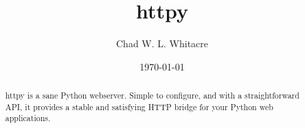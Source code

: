 \documentclass{manual}
\title{httpy}
\author{Chad W. L. Whitacre}
\date\today
\begin{document}
\maketitle

\begin{abstract}

\noindent
httpy is a sane Python webserver. Simple to configure, and with a
straightforward API, it provides a stable and satisfying HTTP bridge for your
Python web applications.

\end{abstract}











%
%
%
\renewcommand{\indexname}{Module Index}

\renewcommand{\indexname}{Index}
\end{document}
